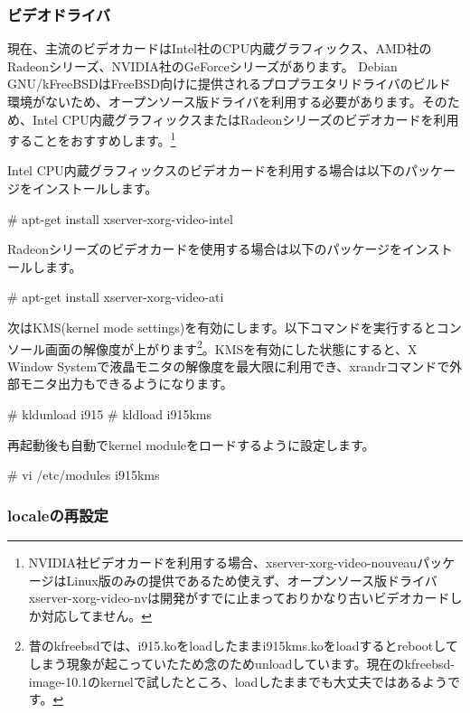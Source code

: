 \documentclass[mingoth,a4paper]{jsarticle}
\begin{document}
\subsubsection{ビデオドライバ}

現在、主流のビデオカードはIntel社のCPU内蔵グラフィックス、AMD社のRadeonシリーズ、NVIDIA社のGeForceシリーズがあります。
Debian GNU/kFreeBSDはFreeBSD向けに提供されるプロプラエタリドライバのビルド環境がないため、オープンソース版ドライバを利用する必要があります。そのため、Intel CPU内蔵グラフィックスまたはRadeonシリーズのビデオカードを利用することをおすすめします。\footnote{NVIDIA社ビデオカードを利用する場合、xserver-xorg-video-nouveauパッケージはLinux版のみの提供であるため使えず、オープンソース版ドライバxserver-xorg-video-nvは開発がすでに止まっておりかなり古いビデオカードしか対応してません。}

Intel CPU内蔵グラフィックスのビデオカードを利用する場合は以下のパッケージをインストールします。

\begin{commandline}
# apt-get install xserver-xorg-video-intel
\end{commandline}

Radeonシリーズのビデオカードを使用する場合は以下のパッケージをインストールします。

\begin{commandline}
# apt-get install xserver-xorg-video-ati
\end{commandline}

次はKMS(kernel mode settings)を有効にします。以下コマンドを実行するとコンソール画面の解像度が上がります\footnote{昔のkfreebsdでは、i915.koをloadしたままi915kms.koをloadするとrebootしてしまう現象が起こっていたため念のためunloadしています。現在のkfreebsd-image-10.1のkernelで試したところ、loadしたままでも大丈夫ではあるようです。}。KMSを有効にした状態にすると、X Window Systemで液晶モニタの解像度を最大限に利用でき、xrandrコマンドで外部モニタ出力もできるようになります。

\begin{commandline}
  # kldunload i915
  # kldload i915kms
\end{commandline}

再起動後も自動でkernel moduleをロードするように設定します。

\begin{commandline}
  # vi /etc/modules
  i915kms
\end{commandline}

\subsubsection{localeの再設定}
\end{document}
